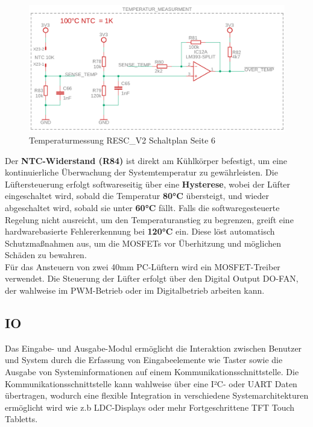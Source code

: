 \documentclass[paper=a4,11pt]{scrreprt}
\begin{document}
\begin{figure}[ht]
\begin{center}
\includegraphics[width=14cm]{Bilder/Temp.PNG}
\caption{Temperaturmessung RESC\_V2 Schaltplan Seite 6}
\label{temp}
\end{center}
\end{figure}

Der \textbf{NTC-Widerstand (R84)} ist direkt am Kühlkörper befestigt, um eine kontinuierliche Überwachung der Systemtemperatur zu gewährleisten. Die Lüftersteuerung erfolgt softwareseitig über eine \textbf{Hysterese}, wobei der Lüfter eingeschaltet wird, sobald die Temperatur \textbf{80°C} übersteigt, und wieder abgeschaltet wird, sobald sie unter \textbf{60°C} fällt. Falls die softwaregesteuerte Regelung nicht ausreicht, um den Temperaturanstieg zu begrenzen, greift eine hardwarebasierte Fehlererkennung bei \textbf{120°C} ein. Diese löst automatisch Schutzmaßnahmen aus, um die MOSFETs vor Überhitzung und möglichen Schäden zu bewahren.\\
Für das Ansteuern von zwei 40mm PC-Lüftern wird ein MOSFET-Treiber verwendet. Die Steuerung der Lüfter erfolgt über den Digital Output DO-FAN, der wahlweise im PWM-Betrieb oder im Digitalbetrieb arbeiten kann.
\newpage
\subsection{IO}
Das Eingabe- und Ausgabe-Modul ermöglicht die Interaktion zwischen Benutzer und System durch die Erfassung von Eingabeelemente wie Taster sowie die Ausgabe von Systeminformationen auf einem Kommunikationsschnittstelle. Die Kommunikationsschnittstelle kann wahlweise über eine I²C- oder UART Daten übertragen, wodurch eine flexible Integration in verschiedene Systemarchitekturen ermöglicht wird wie z.b LDC-Displays oder mehr Fortgeschrittene TFT Touch Tabletts.
\end{document}
